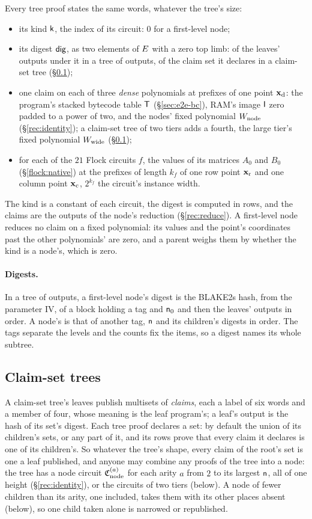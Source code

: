 Every tree proof states the same words, whatever the tree's size:
\begin{itemize}[itemsep=1pt,topsep=3pt]
\item its kind $\mathsf{k}$, the index of its circuit: $0$ for a first-level node;
\item its digest $\mathsf{dig}$, as two elements of $E$ with a zero top limb: of the leaves' outputs under it in a tree of outputs, of the claim set it declares in a claim-set tree (\S\ref{rec:claimsets});
\item one claim on each of three \emph{dense} polynomials at prefixes of one point $\mathbf{x}_{\mathrm{d}}$: the program's stacked bytecode table $\mathsf{T}$ (\S\ref{sec:e2e-bc}), RAM's image $\mathsf{I}$ zero padded to a power of two, and the nodes' fixed polynomial $W_{\mathrm{node}}$ (\S\ref{rec:identity}); a claim-set tree of two tiers adds a fourth, the large tier's fixed polynomial $W_{\mathrm{wide}}$ (\S\ref{rec:claimsets});
\item for each of the $21$ Flock circuits $f$, the values of its matrices $A_0$ and $B_0$ (\S\ref{flock:native}) at the prefixes of length $k_f$ of one row point $\mathbf{x}_{\mathrm{r}}$ and one column point $\mathbf{x}_{\mathrm{c}}$, $2^{k_f}$ the circuit's instance width.
\end{itemize}
The kind is a constant of each circuit, the digest is computed in rows, and the claims are the outputs of the node's reduction (\S\ref{rec:reduce}). A first-level node reduces no claim on a fixed polynomial: its values and the point's coordinates past the other polynomials' are zero, and a parent weighs them by whether the kind is a node's, which is zero.

\paragraph{Digests.} In a tree of outputs, a first-level node's digest is the BLAKE2s hash, from the parameter IV, of a block holding a tag and $\mathsf{n}_0$ and then the leaves' outputs in order. A node's is that of another tag, $\mathsf{n}$ and its children's digests in order. The tags separate the levels and the counts fix the items, so a digest names its whole subtree.

\subsection{Claim-set trees}\label{rec:claimsets}

A claim-set tree's leaves publish multisets of \emph{claims}, each a label of six words and a member of four, whose meaning is the leaf program's; a leaf's output is the hash of its set's digest. Each tree proof declares a set: by default the union of its children's sets, or any part of it, and its rows prove that every claim it declares is one of its children's. So whatever the tree's shape, every claim of the root's set is one a leaf published, and anyone may combine any proofs of the tree into a node: the tree has a node circuit $\mathfrak{C}_{\mathrm{node}}^{(a)}$ for each arity $a$ from $2$ to its largest $\mathsf{n}$, all of one height (\S\ref{rec:identity}), or the circuits of two tiers (below). A node of fewer children than its arity, one included, takes them with its other places absent (below), so one child taken alone is narrowed or republished.


